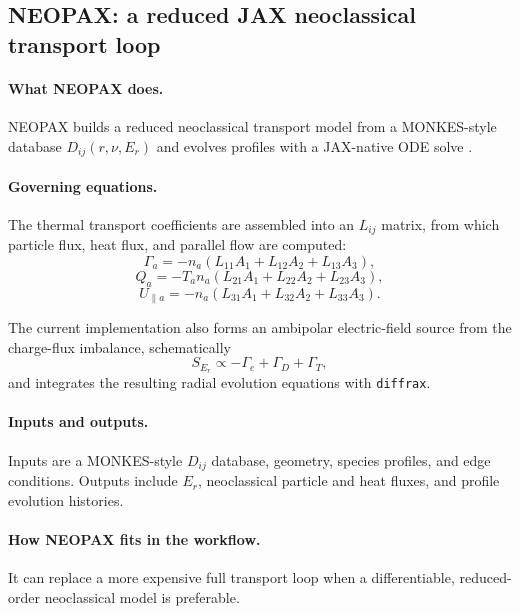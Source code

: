 \documentclass[11pt]{article}
\begin{document}
\subsection{NEOPAX: a reduced JAX neoclassical transport loop}

\paragraph{What NEOPAX does.}
NEOPAX builds a reduced neoclassical transport model from a MONKES-style
database $D_{ij}(r,\nu,E_r)$ and evolves profiles with a JAX-native ODE solve
\citep{NEOPAXRepo}.

\paragraph{Governing equations.}
The thermal transport coefficients are assembled into an $L_{ij}$ matrix, from
which particle flux, heat flux, and parallel flow are computed:
\begin{equation}
\Gamma_a = -n_a\left(L_{11}A_1 + L_{12}A_2 + L_{13}A_3\right),
\end{equation}
\begin{equation}
Q_a = -T_a n_a\left(L_{21}A_1 + L_{22}A_2 + L_{23}A_3\right),
\end{equation}
\begin{equation}
U_{\parallel a}
=
-n_a\left(L_{31}A_1 + L_{32}A_2 + L_{33}A_3\right).
\end{equation}

The current implementation also forms an ambipolar electric-field source from
the charge-flux imbalance, schematically
\begin{equation}
S_{E_r} \propto -\Gamma_e + \Gamma_D + \Gamma_T,
\end{equation}
and integrates the resulting radial evolution equations with \texttt{diffrax}.

\paragraph{Inputs and outputs.}
Inputs are a MONKES-style $D_{ij}$ database, geometry, species profiles, and
edge conditions. Outputs include $E_r$, neoclassical particle and heat fluxes,
and profile evolution histories.

\paragraph{How NEOPAX fits in the workflow.}
It can replace a more expensive full transport loop when a differentiable,
reduced-order neoclassical model is preferable.
\end{document}
